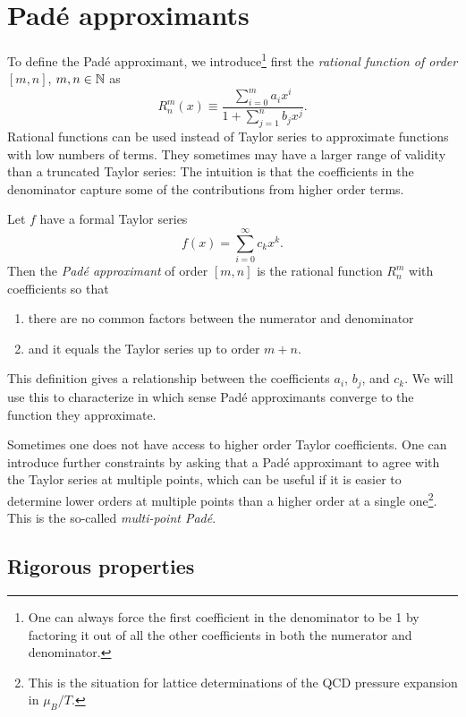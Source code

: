 \section{Pad\'e approximants}

To define the Pad\'e approximant, we introduce\footnote{One can always force
the first coefficient in the denominator to be 1 by factoring it out of all
the other coefficients in both the numerator and denominator.} first the {\it rational
function of order} $[m,n]$, $m,n\in\mathbb{N}$ as 
\begin{equation}
  R_n^m(x)\equiv\frac{\sum_{i=0}^m a_ix^i}{1+\sum_{j=1}^nb_jx^j}.
\end{equation}
Rational functions can be used instead of Taylor series to approximate
functions with low numbers of terms. They sometimes may have a larger range of
validity than a truncated Taylor series: The intuition is that the coefficients
in the denominator capture some of the contributions from higher order terms.

Let $f$ have a formal Taylor series
\begin{equation}
  f(x)=\sum_{i=0}^\infty c_kx^k.
\end{equation}
Then the {\it Pad\'e approximant} of order $[m,n]$ is the rational function
$R_n^m$ with coefficients so that
\begin{enumerate}
  \item there are no common factors between the numerator and denominator
  \item and it equals the Taylor series up to order $m+n$.
\end{enumerate}
This definition gives a relationship between the coefficients $a_i$, $b_j$, and
$c_k$. We will use this to characterize in which sense Pad\'e approximants
converge to the function they approximate.

Sometimes one does not have access to higher order Taylor coefficients.
One can introduce further constraints by asking that a Pad\'e approximant to agree
with the Taylor series at multiple points, which can be useful if it is easier to
determine lower orders at multiple points than a higher order at a single
one\footnote{This is the situation for lattice determinations of the QCD
pressure expansion in $\mu_B/T$.}. This is the so-called
{\it multi-point Pad\'e}.

\subsection{Rigorous properties}

